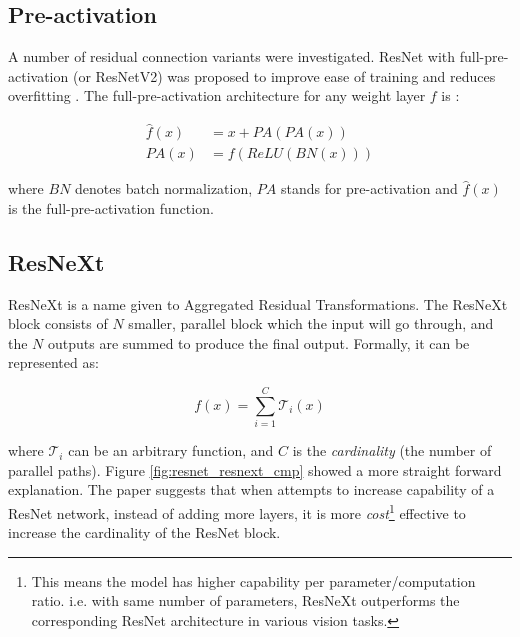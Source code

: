 \subsection{Pre-activation}
A number of residual connection variants were investigated. ResNet with full-pre-activation (or ResNetV2) was proposed to improve ease of training and reduces overfitting \cite{heIdentityMappingsDeep2016a}. The full-pre-activation architecture for any weight layer $f$ is :


\begin{align}
    \hat{f}(x) &= x + PA(PA(x))\\
    PA(x) &= f(ReLU(BN(x)))
\end{align}


where $BN$ denotes batch normalization, $PA$ stands for pre-activation and $\hat{f}(x)$ is the full-pre-activation function. 


\subsection{ResNeXt}
ResNeXt is a name given to Aggregated Residual Transformations\cite{xieAggregatedResidualTransformations2017a}. The ResNeXt block consists of $N$ smaller, parallel block which the input will go through, and the $N$ outputs are summed to produce the final output. Formally, it can be represented as:

$$
f(x)=\sum^{C}_{i=1} \mathcal{T}_i(x)
$$

where $\mathcal{T}_i$ can be an arbitrary function, and $C$ is the \textit{cardinality} (the number of parallel paths). Figure \ref{fig:resnet_resnext_cmp} showed a more straight forward explanation. The paper suggests that when attempts to increase capability of a ResNet network, instead of adding more layers, it is more \textit{cost}\footnote{This means the model has higher capability per parameter/computation ratio. i.e. with same number of parameters, ResNeXt outperforms the corresponding ResNet architecture in various vision tasks.} effective to increase the cardinality of the ResNet block.

